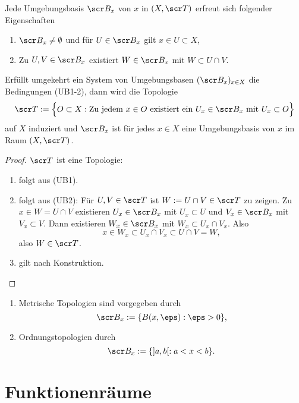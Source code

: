 
\begin{st} \label{st:local_bases}
	Jede Umgebungsbasis $\scr B_x$ von $x$ in $(X, \scr T)$ erfreut sich folgender Eigenschaften
	\begin{enumerate}[(UB1)]
		\item
			$\scr B_x \neq \emptyset$ und für $U \in \scr B_x$ gilt $x \in U \subset X$,
		\item
			Zu $U,V \in \scr B_x$ existiert $W \in \scr B_x$ mit $W \subset U \cap V$.
	\end{enumerate}

	Erfüllt umgekehrt ein System von Umgebungsbasen $(\scr B_x)_{x\in X}$ die Bedingungen (UB1-2), dann wird die Topologie
	\[
		\scr T := \Big\{ O \subset X : \text{Zu jedem $x\in O$ existiert ein $U_x \in \scr B_x$ mit $U_x \subset O$} \Big\}
	\]
	auf $X$ induziert und
	$\scr B_x$ ist für jedes $x \in X$ eine Umgebungsbasis von $x$ im Raum $(X, \scr T)$.
	\begin{proof}
		$\scr T$ ist eine Topologie:
		\begin{enumerate}[(O1)]
			\item
				folgt aus (UB1).
			\item
				folgt aus (UB2):
				Für $U, V \in \scr T$ ist $W := U \cap V \in \scr T$ zu zeigen.
				Zu $x \in W = U \cap V$ existieren $U_x \in \scr B_x$ mit $U_x \subset U$ und $V_x \in \scr B_x$ mit $V_x \subset V$.
				Dann existieren $W_x \in \scr B_x$ mit $W_x \subset U_x \cap V_x$.
				Also
				\[
					x \in W_x \subset U_x \cap V_x \subset U \cap V = W,
				\]
				also $W \in \scr T$.
			\item
				gilt nach Konstruktion.
		\end{enumerate}
	\end{proof}
\end{st}

\begin{ex}
	\begin{enumerate}[1.)]
		\item
			Metrische Topologien sind vorgegeben durch
			\[
				\scr B_x := \{ B(x,\eps) : \eps > 0 \},
			\]
		\item
			Ordnungstopologien durch
			\[
				\scr B_x := \{ ]a,b[ : a < x < b \}.
			\]
	\end{enumerate}
\end{ex}

\section{Funktionenräume}

